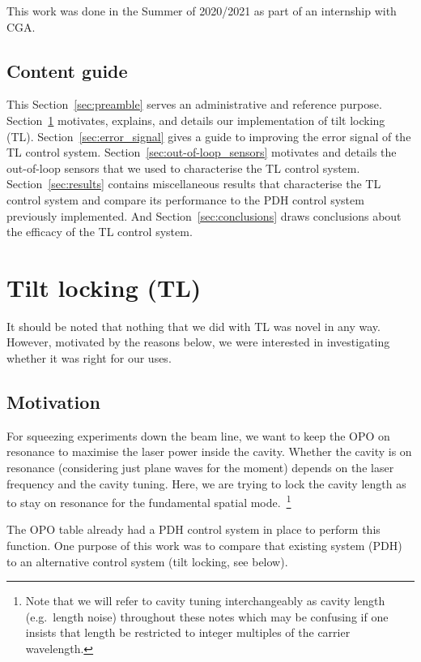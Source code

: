 \documentclass[aps,pra,superscriptaddress,reprint,nofootinbib]{revtex4-1}
\begin{document}
This work was done in the Summer of 2020/2021 as part of an internship with CGA.

\subsection{Content guide}

This Section~\ref{sec:preamble} serves an administrative and reference purpose.
Section~\ref{sec:TL} motivates, explains, and details our implementation of tilt locking (TL).
Section~\ref{sec:error_signal} gives a guide to improving the error signal of the TL control system.
Section~\ref{sec:out-of-loop_sensors} motivates and details the out-of-loop sensors that we used to characterise the TL control system.
Section~\ref{sec:results} contains miscellaneous results that characterise the TL control system and compare its performance to the PDH control system previously implemented.
And Section~\ref{sec:conclusions} draws conclusions about the efficacy of the TL control system.


\section{Tilt locking (TL)}
\label{sec:TL}

It should be noted that nothing that we did with TL was novel in any way. However, motivated by the reasons below, we were interested in investigating whether it was right for our uses.

\subsection{Motivation}

For squeezing experiments down the beam line, we want to keep the OPO on resonance to maximise the laser power inside the cavity. Whether the cavity is on resonance (considering just plane waves for the moment) depends on the laser frequency and the cavity tuning. Here, we are trying to lock the cavity length as to stay on resonance for the fundamental spatial mode.~\footnote{Note that we will refer to cavity tuning interchangeably as cavity length (e.g.\ length noise) throughout these notes which may be confusing if one insists that length be restricted to integer multiples of the carrier wavelength.}


The OPO table already had a PDH control system in place to perform this function. One purpose of this work was to compare that existing system (PDH) to an alternative control system (tilt locking, see below). 
\end{document}
